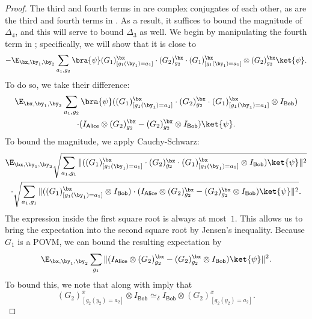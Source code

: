 \documentclass[11pt]{article}
\newcommand{\consistency}{\simeq}
\newcommand{\reg}[1]{{\mathsf{#1}}}
\begin{document}
\begin{proof}
The third and fourth terms in  are complex conjugates of each other,
as are the third and fourth terms in .
As a result, it suffices to bound the magnitude of $\Delta_4$, and this will serve to bound $\Delta_3$ as well.
We begin by manipulating the fourth term in ;
specifically, we will show that it is close to
\begin{equation}\label{eq:cloud}
-\E_{\bx, \by_1, \by_2} \sum_{a_1, g_2} \bra{\psi}
	 (G_1)^{\bx}_{[g_1(\by_1) = a_1]} \cdot (G_2)^{\bx}_{g_2} \cdot (G_1)^{\bx}_{[g_1(\by_1) = a_1]} \otimes (G_2)^{\bx}_{g_2} \ket{\psi}.
\end{equation}
To do so, we take their difference:
\begin{multline*}
\E_{\bx, \by_1, \by_2} \sum_{a_1, g_2} \bra{\psi}
	 ((G_1)^{\bx}_{[g_1(\by_1) = a_1]} \cdot (G_2)^{\bx}_{g_2} \cdot (G_1)^{\bx}_{[g_1(\by_1) = a_1]} \otimes I_{\reg{Bob}})\\
	\cdot (I_{\reg{Alice}} \otimes  (G_2)^{\bx}_{g_2} - (G_2)^{\bx}_{g_2} \otimes I_{\reg{Bob}}) \ket{\psi}.
\end{multline*}
To bound the magnitude, we apply Cauchy-Schwarz:
\begin{multline*}
\E_{\bx, \by_1, \by_2}
	\sqrt{\sum_{a_1, g_1} \Vert  ((G_1)^{\bx}_{[g_1(\by_1) = a_1]} \cdot (G_2)^{\bx}_{g_2} \cdot (G_1)^{\bx}_{[g_1(\by_1) = a_1]} \otimes I_{\reg{Bob}}) \ket{\psi} \Vert^2}\\
	\cdot \sqrt{\sum_{a_1, g_1} \Vert ((G_1)^{\bx}_{[g_1(\by_1) = a_1]} \otimes I_{\reg{Bob}})
	\cdot (I_{\reg{Alice}} \otimes  (G_2)^{\bx}_{g_2} - (G_2)^{\bx}_{g_2} \otimes I_{\reg{Bob}}) \ket{\psi} \Vert^2}.
\end{multline*}
The expression inside the first square root is always at most~$1$.
This allows us to bring the expectation into the second square root by Jensen's inequality.
Because $G_1$ is a POVM, we can bound the resulting expectation by
\begin{equation}\label{eq:majora}
\E_{\bx, \by_1, \by_2} \sum_{g_1} \Vert (I_{\reg{Alice}} \otimes  (G_2)^{\bx}_{g_2} - (G_2)^{\bx}_{g_2} \otimes I_{\reg{Bob}}) \ket{\psi} \Vert^2.
\end{equation}
To bound this, we note that  along with  imply that
\begin{equation*}
(G_2)^{x}_{[g_2(y_2) = a_2]} \otimes I_{\reg{Bob}}
\consistency_{\delta} I_{\reg{Bob}} \otimes (G_2)^{x}_{[g_2(y_2) = a_2]}.

\end{equation*}
\end{proof}
\end{document}
